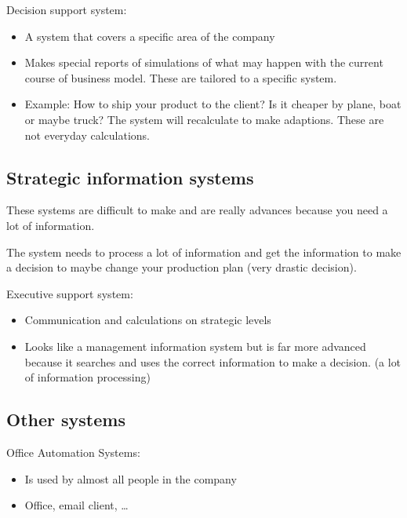 \documentclass{article}
\begin{document}
Decision support system:

\begin{itemize}
\item  A system that covers a specific area of the company

\item  Makes special reports of simulations of what may happen with the current course of business model. These are tailored to a specific system.

\item  Example: How to ship your product to the client? Is it cheaper by plane, boat or maybe truck? The system will recalculate to make adaptions. These are not everyday calculations.
\end{itemize}

\subsection{Strategic information systems}

These systems are difficult to make and are really advances because you need a lot of information.

\hfill \newline
The system needs to process a lot of information and get the information to make a decision to maybe change your production plan (very drastic decision).

\hfill \newline 
Executive support system:

\begin{itemize}
\item  Communication and calculations on strategic levels

\item  Looks like a management information system but is far more advanced because it searches and uses the correct information to make a decision. (a lot of information processing)
\end{itemize}

\subsection{Other systems}

Office Automation Systems:

\begin{itemize}
\item  Is used by almost all people in the company

\item  Office, email client, \dots 
\end{itemize}
\end{document}
